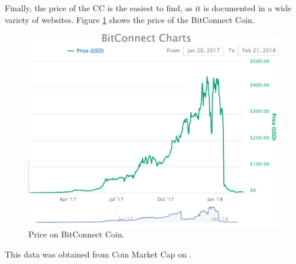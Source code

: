 \noindent Finally, the price of the CC is the easiest to find, as it is documented in a wide variety of websites. Figure \ref{img-pricebcc} shows the price of the BitConnect Coin.

\begin{figure}[H]
	\centering
    \includegraphics[scale=0.7]{files/Price_bCC.pdf}
    \caption{Price on BitConnect Coin.}
    \label{img-pricebcc}
\end{figure}

This data was obtained from Coin Market Cap on \cite{cmc}.
